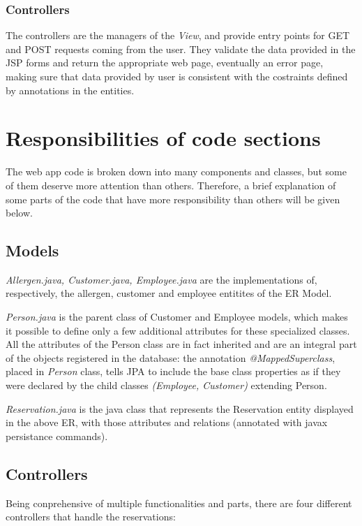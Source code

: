 \documentclass{article}
\begin{document}
    \subsubsection*{Controllers}
    The controllers are the managers of the \textit{View}, and provide entry points for GET and POST requests coming from the user. They validate the data provided in the JSP forms and return the appropriate web page, eventually an error page, making sure that data provided by user is consistent with the costraints defined by annotations in the entities.

    \vspace{10mm}
    \section*{Responsibilities of code sections}
    The web app code is broken down into many components and classes, but some of them deserve more attention than others. Therefore, a brief explanation of some parts of the code that have more responsibility than others will be given below.

    \subsection*{Models}
    \textit{Allergen.java, Customer.java, Employee.java} are the implementations of, respectively, the allergen, customer and employee entitites of the ER Model.

    \textit{Person.java} is the parent class of Customer and Employee models, which makes it possible to define only a few additional attributes for these specialized classes. All the attributes of the Person class are in fact inherited and are an integral part of the objects registered in the database: the annotation \textit{@MappedSuperclass}, placed in \textit{Person} class, tells JPA to include the base class properties as if they were declared by the child classes \textit{(Employee, Customer)} extending Person.

    \textit{Reservation.java} is the java class that represents
    the Reservation entity displayed in the above ER, with those attributes and relations
    (annotated with javax persistance commands).

    \subsection*{Controllers}
    Being conprehensive of multiple functionalities and parts, there are four different
    controllers that handle the reservations:
\end{document}
